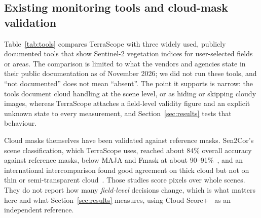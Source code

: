 \documentclass[conference]{IEEEtran}
\begin{document}
\subsection{Existing monitoring tools and cloud-mask validation}\label{sec:tools}
Table~\ref{tab:tools} compares TerraScope with three widely used, publicly documented tools that show Sentinel-2 vegetation indices for user-selected fields or areas. The comparison is limited to what the vendors and agencies state in their public documentation as of November 2026; we did not run these tools, and ``not documented'' does not mean ``absent''. The point it supports is narrow: the tools document cloud handling at the scene level, or as hiding or skipping cloudy images, whereas TerraScope attaches a field-level validity figure and an explicit unknown state to every measurement, and Section~\ref{sec:results} tests that behaviour.

\begin{table}[t]
\caption{Documented cloud handling and change alerts in related tools (public documentation, Nov. 2026)}
\label{tab:tools}
\centering
{}
\end{table}

Cloud masks themselves have been validated against reference masks. Sen2Cor's scene classification, which TerraScope uses, reached about 84\% overall accuracy against reference masks, below MAJA and Fmask at about 90--91\%~\cite{baetens2019}, and an international intercomparison found good agreement on thick cloud but not on thin or semi-transparent cloud~\cite{skakun2022}. Those studies score pixels over whole scenes. They do not report how many \emph{field-level} decisions change, which is what matters here and what Section~\ref{sec:results} measures, using Cloud Score+~\cite{pasquarella2023} as an independent reference.
\end{document}
